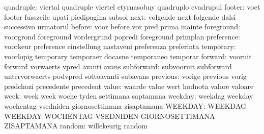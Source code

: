                 quadruple: viertal                   quadruple
                           viertel                   ctyrnasobny
                           quadruplo                 cvadrupul
                   footer: voet                      footer
                           fusszeile                 upati
                           piedipagina               subsol
                     next: volgende                  next
                           folgende                  dalsi
                           successivo                urmatorul
                   before: voor                      before
                           vor                       pred
                           prima                     inainte
               foreground: voorgrond                 foreground
                           vordergrund               popredi
                           foreground                primplan
               preference: voorkeur                  preference
                           einstellung               nastaveni
                           preferenza                preferinta
                temporary: voorlopig                 temporary
                           temporaer                 docasne
                           temporaneo                temporar
                  forward: vooruit                   forward
                           vorwaerts                 vpred
                           avanti                    avans
               subforward: subvooruit                subforward
                           untervorwaerts            podvpred
                           sottoavanti               subavans
                 previous: vorige                    previous
                           vorig                     predchozi
                           precedente                precedent
                    value: waarde                    value
                           wert                      hodnota
                           valore                    valoare
                     week: week                      week
                           woche                     tyden
                           settimana                 saptamana
                  weekday: weekdag                   weekday
                           wochentag                 vsedniden
                           giornosettimana           zisaptamana
                  WEEKDAY: WEEKDAG                   WEEKDAY
                           WOCHENTAG                 VSEDNIDEN
                           GIORNOSETTIMANA           ZISAPTAMANA
                   random: willekeurig               random
